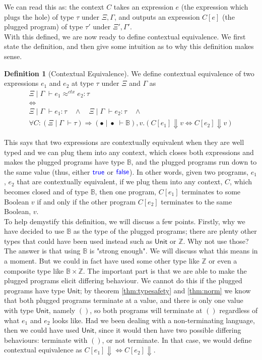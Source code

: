 \documentclass[twoside,11pt,openright]{report}
\theoremstyle{definition}
\newtheorem{definition}{Definition}[section]
\newcommand{\Keyword}[1]{{\color{blue} \mathsf{#1}}}
\newcommand{\expr}{e}
\newcommand{\val}{v}
\newcommand{\TT}{()}
\newcommand{\True}{\Keyword{true}}
\newcommand{\False}{\Keyword{false}}
\newcommand{\ctx}{C}
\newcommand{\Tunit}{\mathsf{Unit}}
\newcommand{\Tint}{\mathbb{Z}}
\newcommand{\Tbool}{\mathbb{B}}
\newcommand{\Tprod}[2]{#1 \times #2}
\newcommand{\typ}{\tau}
\newcommand{\venv}{\Gamma}
\newcommand{\tenv}{\Xi}
\newcommand{\emptenv}{\bullet}
\newcommand{\empvenv}{\bullet}
\newcommand{\jdg}[4]{#1 \; | \; #2 \; \vdash #3 : #4}
\newcommand{\jdgType}[3]{#1 \; | \; #2 \; \vdash #3}
\newcommand{\jdgRel}[6]{#1 \; | \; #2 \; \vdash #3 \approx^{#4} #5 : #6}
\newcommand{\ctxRel}[5]{\jdgRel{#1}{#2}{#3}{ctx}{#4}{#5}}
\begin{document}
We can read this as: the context $\ctx$ takes an expression $\expr$ (the expression which plugs the hole) of type $\typ$ under $\tenv, \venv$, and outputs an expression $\ctx[\expr]$ (the plugged program) of type $\typ'$ under $\tenv', \venv'$.\\
With this defined, we are now ready to define contextual equivalence. We first state the definition, and then give some intuition as to why this definition makes sense. 
\begin{definition}[Contextual Equivalence]\label{def:CE}
  We define contextual equivalence of two expressions $\expr_1$ and $\expr_2$ at type $\typ$ under $\tenv$ and $\venv$ as
  \begin{equation*}
    \begin{gathered}
      \ctxRel{\tenv}{\venv}{\expr_1}{\expr_2}{\typ}\\
      \iff\\
      \jdg{\tenv}{\venv}{\expr_1}{\typ} \quad \land \quad
      \jdg{\tenv}{\venv}{\expr_2}{\typ} \quad \land \quad\\
      \forall \ctx : (\jdgType{\tenv}{\venv}{\typ}) \Rightarrow (\jdgType{\emptenv}{\empvenv}{\Tbool}), \val . (\ctx[\expr_1] \Downarrow \val \iff \ctx[\expr_2] \Downarrow \val)
    \end{gathered}
  \end{equation*}
\end{definition}
This says that two expressions are contextually equivalent when they are well typed and we can plug them into any context, which closes both expressions and makes the plugged programs have type $\Tbool$, and the plugged programs run down to the same value (thus, either $\True$ or $\False$). In other words, given two programs, $\expr_1$, $\expr_2$ that are contextually equivalent, if we plug them into any context, $\ctx$, which becomes closed and of type $\Tbool$, then one program, $\ctx[\expr_1]$ terminates to some Boolean $\val$ if and only if the other program $\ctx[\expr_2]$ terminates to the same Boolean, $\val$.\\
To help demystify this definition, we will discuss a few points. Firstly, why we have decided to use $\Tbool$ as the type of the plugged programs; there are plenty other types that could have been used instead such as $\Tunit$ or $\Tint$. Why not use those? The answer is that using $\Tbool$ is "strong enough". We will discuss what this means in a moment. But we could in fact have used some other type like $\Tint$ or even a composite type like $\Tprod{\Tbool}{\Tint}$. The important part is that we are able to make the plugged programs elicit differing behaviour. We cannot do this if the plugged programs have type $\Tunit$; by theorem \ref{thm:typesafety} and \ref{thm:norm} we know that both plugged programs terminate at a value, and there is only one value with type $\Tunit$, namely $\TT$, so both programs will terminate at $\TT$ regardless of what $\expr_1$ and $\expr_2$ looks like. Had we been dealing with a non-terminating language, then we could have used $\Tunit$, since it would then have two possible differing behaviours: terminate with $\TT$, or not terminate. In that case, we would define contextual equivalence as $\ctx[\expr_1] \Downarrow \iff \ctx[\expr_2] \Downarrow$.
\end{document}
